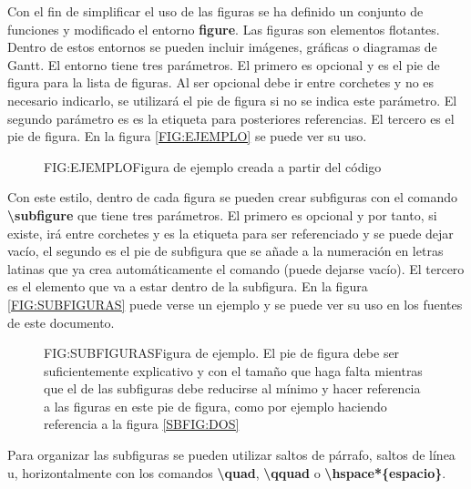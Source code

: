 Con el fin de simplificar el uso de las figuras se ha definido un conjunto de funciones y modificado el entorno \textbf{figure}. Las figuras son elementos flotantes. Dentro de estos entornos se pueden incluir imágenes, gráficas o diagramas de Gantt.
El entorno tiene tres parámetros. El primero es opcional y es el pie de figura para la lista de figuras. Al ser opcional debe ir entre corchetes y no es necesario indicarlo, se utilizará el pie de figura si no se indica este parámetro. El segundo parámetro es es la etiqueta para posteriores referencias. El tercero es el pie de figura. En la figura \ref{FIG:EJEMPLO} se puede ver su uso.

\begin{figure}[Ejemplo de uso de figure]{FIG:EJEMPLO}{Figura de ejemplo creada a partir del código}
\end{figure}

Con este estilo, dentro de cada figura se pueden crear subfiguras con el comando \textbf{{\textbackslash}subfigure} que tiene tres parámetros. El primero es opcional y por tanto, si existe, irá entre corchetes y es la etiqueta para ser referenciado y se puede dejar vacío, el segundo es el pie de subfigura que se añade a la numeración en letras latinas que ya crea automáticamente el comando (puede dejarse vacío). El tercero es el elemento que va a estar dentro de la subfigura. En la figura \ref{FIG:SUBFIGURAS} puede verse un ejemplo y se puede ver su uso en los fuentes de este documento.

\begin{figure}[Ejemplo de uso de figure]{FIG:SUBFIGURAS}{Figura de ejemplo. El pie de figura debe ser suficientemente explicativo y con el tamaño que haga falta mientras que el de las subfiguras debe reducirse al mínimo y hacer referencia a las figuras en este pie de figura, como por ejemplo haciendo referencia a la figura \ref{SBFIG:DOS}}
   \quad
\end{figure}

Para organizar las subfiguras se pueden utilizar saltos de párrafo, saltos de línea u, horizontalmente con los comandos \textbf{\textbackslash quad}, \textbf{\textbackslash qquad} o \textbf{\textbackslash hspace*\{espacio\}}.
